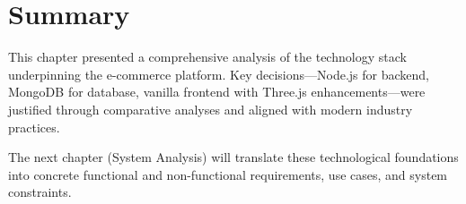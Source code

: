\section{Summary}

This chapter presented a comprehensive analysis of the technology stack underpinning the e-commerce platform. Key decisions—Node.js for backend, MongoDB for database, vanilla frontend with Three.js enhancements—were justified through comparative analyses and aligned with modern industry practices.

The next chapter (System Analysis) will translate these technological foundations into concrete functional and non-functional requirements, use cases, and system constraints.

